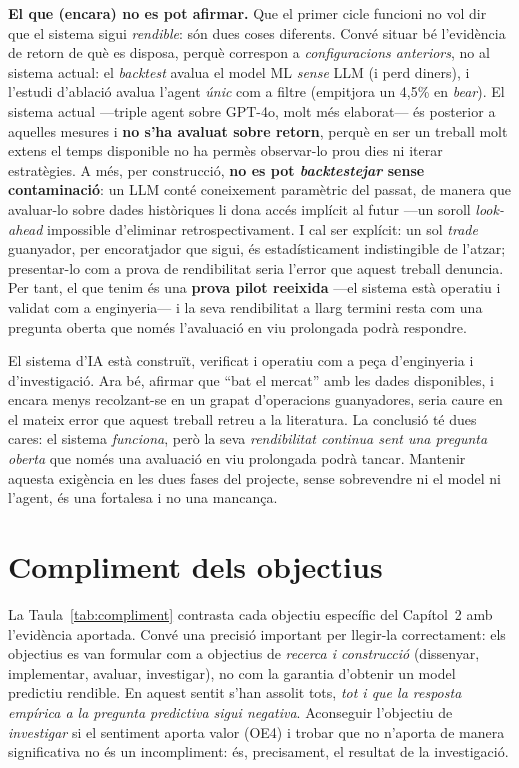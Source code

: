 \documentclass[12pt, a4paper]{report}
\begin{document}
\textbf{El que (encara) no es pot afirmar.} Que el primer cicle funcioni no vol dir que el sistema sigui \emph{rendible}: són dues coses diferents. Convé situar bé l'evidència de retorn de què es disposa, perquè correspon a \emph{configuracions anteriors}, no al sistema actual: el \textit{backtest} avalua el model ML \emph{sense} LLM (i perd diners), i l'estudi d'ablació avalua l'agent \emph{únic} com a filtre (empitjora un 4,5\% en \textit{bear}). El sistema actual ---triple agent sobre GPT-4o, molt més elaborat--- és posterior a aquelles mesures i \textbf{no s'ha avaluat sobre retorn}, perquè en ser un treball molt extens el temps disponible no ha permès observar-lo prou dies ni iterar estratègies. A més, per construcció, \textbf{no es pot \textit{backtestejar} sense contaminació}: un LLM conté coneixement paramètric del passat, de manera que avaluar-lo sobre dades històriques li dona accés implícit al futur ---un soroll \textit{look-ahead} impossible d'eliminar retrospectivament. I cal ser explícit: un sol \textit{trade} guanyador, per encoratjador que sigui, és estadísticament indistingible de l'atzar; presentar-lo com a prova de rendibilitat seria l'error que aquest treball denuncia. Per tant, el que tenim és una \textbf{prova pilot reeixida} ---el sistema està operatiu i validat com a enginyeria--- i la seva rendibilitat a llarg termini resta com una pregunta oberta que només l'avaluació en viu prolongada podrà respondre.

\begin{infobox}
El sistema d'IA està construït, verificat i operatiu com a peça d'enginyeria i d'investigació. Ara bé, afirmar que ``bat el mercat'' amb les dades disponibles, i encara menys recolzant-se en un grapat d'operacions guanyadores, seria caure en el mateix error que aquest treball retreu a la literatura. La conclusió té dues cares: el sistema \emph{funciona}, però la seva \emph{rendibilitat continua sent una pregunta oberta} que només una avaluació en viu prolongada podrà tancar. Mantenir aquesta exigència en les dues fases del projecte, sense sobrevendre ni el model ni l'agent, és una fortalesa i no una mancança.
\end{infobox}

\section{Compliment dels objectius}

La Taula~\ref{tab:compliment} contrasta cada objectiu específic del Capítol~2 amb l'evidència aportada. Convé una precisió important per llegir-la correctament: els objectius es van formular com a objectius de \emph{recerca i construcció} (dissenyar, implementar, avaluar, investigar), no com la garantia d'obtenir un model predictiu rendible. En aquest sentit s'han assolit tots, \emph{tot i que la resposta empírica a la pregunta predictiva sigui negativa}. Aconseguir l'objectiu de \emph{investigar} si el sentiment aporta valor (OE4) i trobar que no n'aporta de manera significativa no és un incompliment: és, precisament, el resultat de la investigació.
\end{document}
